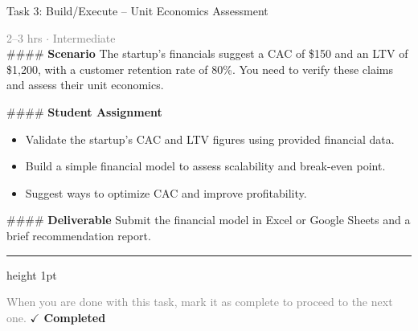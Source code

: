 \documentclass[10pt,a4paper]{article}
\begin{document}
\begin{taskbox}{Task 3: Build/Execute – Unit Economics Assessment}

    {\small \textcolor{gray}{2--3 hrs $\cdot$ Intermediate}}\\[12pt]

    \#\#\#\# \textbf{Scenario}  
The startup’s financials suggest a CAC of \$150 and an LTV of \$1,200, with a customer retention rate of 80\%. You need to verify these claims and assess their unit economics.  

\#\#\#\# \textbf{Student Assignment}  
\begin{itemize}
    \item Validate the startup’s CAC and LTV figures using provided financial data.  
    \item Build a simple financial model to assess scalability and break-even point.  
    \item Suggest ways to optimize CAC and improve profitability.  
\end{itemize}

\#\#\#\# \textbf{Deliverable}  
Submit the financial model in Excel or Google Sheets and a brief recommendation report.\par

    \vspace{16pt}

    \textcolor{cardBorder}{\hrule height 1pt}\vspace{8pt}

    \small \textcolor{gray}{When you are done with this task, mark it as complete to proceed to the next one.} \hfill \textbf{\textcolor{brandDark}{$\checkmark$ Completed}}

\end{taskbox}
\end{document}
